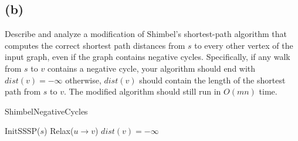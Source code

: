 \documentclass[12pt]{article}
\begin{document}
\subsection*{(b)}
Describe and analyze a modification of Shimbel's shortest-path
algorithm that computes the correct shortest path distances from $s$ to
every other vertex of the input graph, even if the graph contains
negative cycles. Specifically, if any walk from $s$ to $v$ contains a
negative cycle, your algorithm should end with $dist(v) = -\infty$
otherwise, $dist(v)$ should contain the length of the shortest path
from $s$ to $v$. The modified algorithm should still run in $O(mn)$
time.

\begin{algorithm}
\caption{ShimbelNegativeCycles}
\begin{algorithmic}
    \STATE InitSSSP($s$)
                \STATE Relax($u \rightarrow v$)
            \ENDIF
        \ENDFOR
    \ENDFOR
            \STATE $dist(v) = -\infty$
        \ENDIF
    \ENDFOR
\end{algorithmic}
\end{algorithm}
\end{document}
